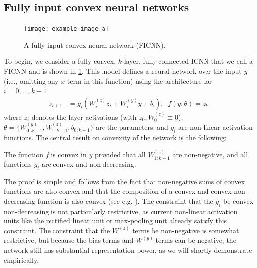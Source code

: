 \subsection{Fully input convex neural networks}

\begin{figure}[t]
  \centering
    \texttt{[image: example-image-a]}
  \caption{A fully input convex neural network (FICNN).}
  \label{fig:ficnn}
\end{figure}

To begin, we consider a fully convex, $k$-layer, fully connected ICNN
that we call a FICNN and is shown in \cref{fig:ficnn}.
This model defines a neural network over the input $y$
(i.e., omitting any $x$ term in this function) using the architecture for
$i=0,\ldots,k-1$
\begin{equation}
\begin{split}
\label{eq-ficnn}
z_{i+1} & = g_i\left(W^{(z)}_i z_i + W^{(y)}_i y + b_i \right ), \;\; f
(y;\theta) = z_k
\end{split}
\end{equation}
where $z_i$ denotes the layer activations (with $z_0, W^{(z)}_0 \equiv 0$),
$\theta = \{W^ {(y)}_{0:k-1}, W^{(z)}_{1:k-1}, b_{0:k-1}\}$ are the
parameters, and $g_i$ are non-linear activation functions.  The central result
on convexity of the network is the following:
\begin{proposition}\label{prop-convex}
The function $f$ is convex in $y$ provided that all
$W^{(z)}_{1:k-1}$ are non-negative, and all functions $g_i$ are convex and
non-decreasing.
\end{proposition}
The proof is simple and follows from the fact that
non-negative sums of convex functions are also convex and that the composition
of a convex and convex non-decreasing function is also convex
(see e.g. \citet[3.2.4]{boyd2004convex}).
The constraint that the $g_i$ be convex
non-decreasing is not particularly restrictive, as current non-linear activation
units like the rectified linear unit or max-pooling unit already satisfy this
constraint.  The constraint that the $W^{(z)}$ terms be non-negative is
somewhat restrictive, but because the bias terms and $W^{(y)}$ terms can be
negative, the network still has substantial representation power, as we will
shortly demonstrate empirically.

